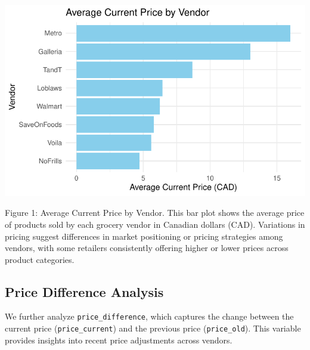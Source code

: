 \documentclass[
  letterpaper,
  DIV=11,
  numbers=noendperiod]{scrartcl}
\begin{document}
\includegraphics{paper_files/figure-pdf/unnamed-chunk-4-1.pdf}

Figure 1: Average Current Price by Vendor. This bar plot shows the
average price of products sold by each grocery vendor in Canadian
dollars (CAD). Variations in pricing suggest differences in market
positioning or pricing strategies among vendors, with some retailers
consistently offering higher or lower prices across product categories.

\subsection{Price Difference Analysis}\label{price-difference-analysis}

We further analyze \texttt{price\_difference}, which captures the change
between the current price (\texttt{price\_current}) and the previous
price (\texttt{price\_old}). This variable provides insights into recent
price adjustments across vendors.
\end{document}

